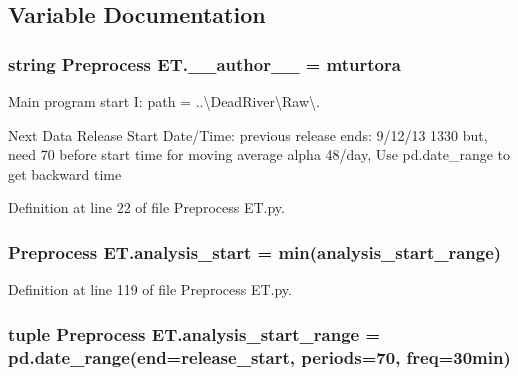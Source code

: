 \subsection{Variable Documentation}
\hypertarget{namespace_preprocess_01_e_t_af567d53c78b91e20299e248e7406204c}{}
\subsubsection[{\+\_\+\+\_\+author\+\_\+\+\_\+}]{\setlength{\rightskip}{0pt plus 5cm}string Preprocess E\+T.\+\_\+\+\_\+author\+\_\+\+\_\+ = \textquotesingle{}mturtora\textquotesingle{}}\label{namespace_preprocess_01_e_t_af567d53c78b91e20299e248e7406204c}


Main program start I\+: path = \textquotesingle{}..\textbackslash{}Dead\+River\textbackslash{}Raw\textbackslash{}\textquotesingle{}. 

Next Data Release Start Date/\+Time\+: previous release ends\+: 9/12/13 1330 but, need 70 before start time for moving average alpha 48/day, Use pd.\+date\+\_\+range to get backward time 

Definition at line 22 of file Preprocess E\+T.\+py.

\hypertarget{namespace_preprocess_01_e_t_adb1bbba4e6366ba6edb532e941cc5b89}{}
\subsubsection[{analysis\+\_\+start}]{\setlength{\rightskip}{0pt plus 5cm}Preprocess E\+T.\+analysis\+\_\+start = min({\bf analysis\+\_\+start\+\_\+range})}\label{namespace_preprocess_01_e_t_adb1bbba4e6366ba6edb532e941cc5b89}


Definition at line 119 of file Preprocess E\+T.\+py.

\hypertarget{namespace_preprocess_01_e_t_a7cd48cca4b37e2ed1fd0402b315c2d39}{}
\subsubsection[{analysis\+\_\+start\+\_\+range}]{\setlength{\rightskip}{0pt plus 5cm}tuple Preprocess E\+T.\+analysis\+\_\+start\+\_\+range = pd.\+date\+\_\+range(end={\bf release\+\_\+start}, periods=70, freq=\textquotesingle{}30min\textquotesingle{})}\label{namespace_preprocess_01_e_t_a7cd48cca4b37e2ed1fd0402b315c2d39}



